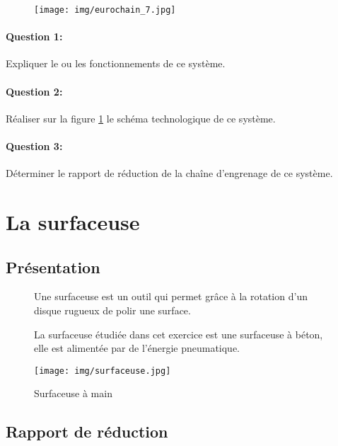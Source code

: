 \newpage

\begin{figure}[!ht]
 \centering\texttt{[image: img/eurochain\_7.jpg]}
 \label{fig75}
\end{figure}

\paragraph{Question 1:} Expliquer le ou les fonctionnements de ce système.

\paragraph{Question 2:} Réaliser sur la figure \ref{fig75} le schéma technologique de ce système.

\paragraph{Question 3:} Déterminer le rapport de réduction de la chaîne d'engrenage de ce système.

\newpage



\newpage

\section{La surfaceuse}

\subsection{Présentation}
\begin{figure}[!h]
\begin{minipage}{0.6\linewidth}
Une surfaceuse est un outil qui permet grâce à la rotation d'un disque rugueux de polir une surface.

La surfaceuse étudiée dans cet exercice est une surfaceuse à béton, elle est alimentée par de l'énergie pneumatique.
\end{minipage}
 \hfill
\begin{minipage}{0.35\linewidth}
 \centering\texttt{[image: img/surfaceuse.jpg]}
 \caption{Surfaceuse à main}
 \label{fig8}
\end{minipage}
\end{figure}

\subsection{Rapport de réduction}

